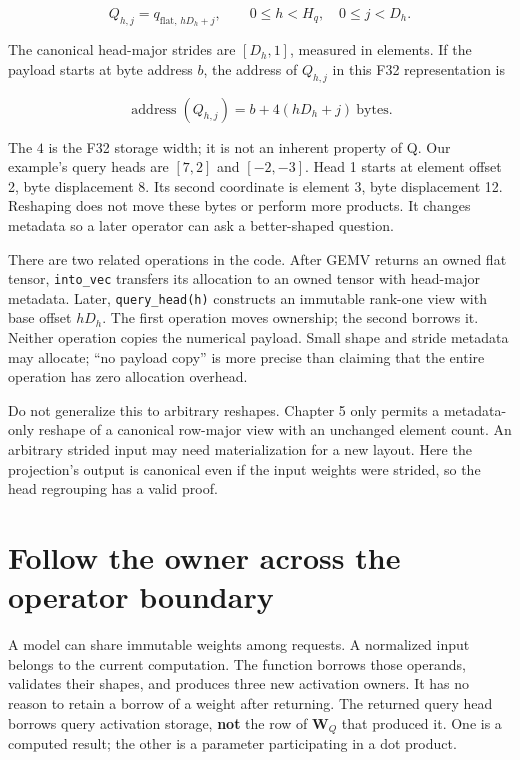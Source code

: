 \begin{equation}
Q_{h,j}=q_{\mathrm{flat},\,hD_h+j},
\qquad 0\le h<H_q,\quad 0\le j<D_h.
\end{equation}

The canonical head-major strides are \([D_h,1]\), measured in elements.
If the payload starts at byte address \(b\), the address of \(Q_{h,j}\)
in this F32 representation is

\begin{equation}
\operatorname{address}(Q_{h,j})=b+4(hD_h+j)\ \text{bytes}.
\end{equation}

The \(4\) is the F32 storage width; it is not an inherent property of Q.
Our example's query heads are \([7,2]\) and \([-2,-3]\). Head 1 starts
at element offset 2, byte displacement 8. Its second coordinate is
element 3, byte displacement 12. Reshaping does not move these bytes or
perform more products. It changes metadata so a later operator can ask a
better-shaped question.

There are two related operations in the code. After GEMV returns an
owned flat tensor, \texttt{into\_vec} transfers its allocation to an
owned tensor with head-major metadata. Later, \texttt{query\_head(h)}
constructs an immutable rank-one view with base offset \(hD_h\). The
first operation moves ownership; the second borrows it. Neither
operation copies the numerical payload. Small shape and stride metadata
may allocate; ``no payload copy'' is more precise than claiming that the
entire operation has zero allocation overhead.

Do not generalize this to arbitrary reshapes. Chapter 5 only permits a
metadata-only reshape of a canonical row-major view with an unchanged
element count. An arbitrary strided input may need materialization for a
new layout. Here the projection's output is canonical even if the input
weights were strided, so the head regrouping has a valid proof.

\section{Follow the owner across the operator
boundary}\label{follow-the-owner-across-the-operator-boundary}


A model can share immutable weights among requests. A normalized input
belongs to the current computation. The function borrows those operands,
validates their shapes, and produces three new activation owners. It has
no reason to retain a borrow of a weight after returning. The returned
query head borrows query activation storage, \textbf{not} the row of
\(\mathbf{W}_Q\) that produced it. One is a computed result; the other
is a parameter participating in a dot product.

